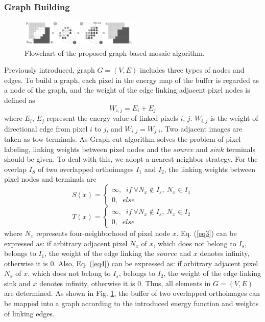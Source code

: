 \documentclass[journal]{IEEEtran}
\begin{document}
\subsubsection{Graph Building}
\begin{figure}[!t]
	\centering
	\includegraphics[width=0.5\textwidth]{link}
	\caption{Flowchart of the proposed graph-based mosaic algorithm.}
	\label{fig:link}
\end{figure}
Previously introduced, graph $G=\left(V, E \right)$ includes three types of nodes and edges. To build a graph, each pixel in the energy map of the buffer is regarded as a node of the graph, and the weight of the edge linking adjacent pixel nodes is defined as
\begin{equation}\label{eq2}
W_{i,j}=E_{i}+E_{j}
\end{equation}
where $E_i$, $E_j$ represent the energy value of linked pixels $i$, $j$. $W_{i,j}$ is the weight of directional edge from pixel $i$ to $j$, and $W_{i,j}=W_{j,i}$. Two adjacent images are taken as tow terminals. As Graph-cut algorithm solves the problem of pixel labeling, linking weights between pixel nodes and the $source$ and $sink$ terminals should be given. To deal with this, we adopt a nearest-neighbor strategy. For the overlap $I_S$ of two overlapped orthoimages $I_1$ and $I_2$, the linking weights between pixel nodes and terminals are
\begin{equation}\label{eq3}
S(x)= \left\{ {\begin{array}{*{20}{c}}
	{\infty,\;\;if~\forall N_{x}\notin I_{s},~N_{x}\in I_{1}}\\
	{0 ,\;\;else}
	\end{array}} \right.
\end{equation}
\begin{equation}\label{eq4}
T(x)= \left\{ {\begin{array}{*{20}{c}} 
	{\infty,\;\;if~\forall N_{x}\notin I_{s},~N_{x}\in I_{2}}\\
	{0 ,\;\;else}
	\end{array}} \right.
\end{equation}
where $N_x$ represents four-neighborhood of pixel node $x$. Eq. (\ref{eq3}) can be expressed as: if arbitrary adjacent pixel $N_x$ of $x$, which does not belong to $I_s$, belongs to $I_1$, the weight of the edge linking the $source$ and $x$ denotes infinity, otherwise it is 0. Also, Eq. (\ref{eq4}) can be expressed as: if arbitrary adjacent pixel $N_x$ of $x$, which does not belong to $I_s$, belongs to $I_2$, the weight of the edge linking sink and $x$ denotes infinity, otherwise it is 0. Thus, all elements in $G= (V, E)$ are determined. As shown in Fig. \ref{fig:link}, the buffer of two overlapped orthoimages can be mapped into a graph according to the introduced energy function and weights of linking edges.
\end{document}
